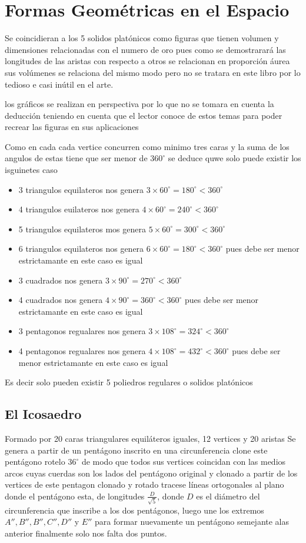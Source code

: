 \documentclass[a4paper]{book}
\begin{document}
\chapter{Formas Geométricas en el Espacio}
Se coincidieran a los 5 solidos platónicos como figuras que tienen volumen y dimensiones relacionadas con el numero de oro pues como se demostrarará  las longitudes de las aristas con respecto a otros se relacionan en proporción áurea sus volúmenes se relaciona del mismo modo pero no se tratara en este libro por lo tedioso e casi inútil en el arte.

los gráficos se realizan en perspectiva por lo que no se tomara en cuenta la deducción teniendo en cuenta que el lector conoce de estos temas  para poder recrear las figuras en sus aplicaciones


Como en cada cada vertice concurren como minimo tres caras y la suma de los angulos de estas tiene que ser menor de $360^\circ$ se deduce quwe solo puede existir los isguinetes caso

\begin{itemize}
  \item 3 triangulos equilateros nos genera $3\times 60^\circ=180^\circ < 360^\circ$
  \item 4 triangulos euilateros nos genera $4\times 60^\circ=240^\circ < 360^\circ$
  \item 5 triangulos equilateros mos genera $5\times 60^\circ=300^\circ < 360^\circ$
  \item 6 triangulos equilateros nos genera $6\times 60^\circ=180^\circ < 360^\circ$ pues debe ser menor estrictamante en este caso es igual
  \item 3 cuadrados nos genera $3\times 90^\circ=270^\circ < 360^\circ$
  \item 4 cuadrados nos genera $4\times 90^\circ=360^\circ < 360^\circ$ pues debe ser menor estrictamante en este caso es igual
  \item 3 pentagonos regualares nos genera $3\times 108^\circ=324^\circ < 360^\circ$
  \item 4 pentagonos regualares nos genera $4\times 108^\circ=432^\circ < 360^\circ$ pues debe ser menor estrictamante en este caso es igual
\end{itemize}

 Es decir solo pueden existir  5 poliedros regulares o solidos platónicos

\section{El Icosaedro}
Formado por 20 caras triangulares equiláteros iguales, 12 vertices y 20 aristas
Se genera a partir de un pentágono inscrito en una circunferencia  clone este pentágono rotelo $36^\circ$ de modo que todos sus vertices coincidan con las medios arcos cuyas cuerdas son los lados del pentágono original y clonado  a partir de los vertices de este pentagon clonado y rotado  tracese líneas ortogonales al plano donde el pentágono esta, de longitudes $\frac{D}{\sqrt{5}}$, donde $D$ es el diámetro del circunferencia que inscribe a los dos pentágonos, luego une los extremos $A'',B'',B'',C'',D''$ y $E''$ para formar nuevamente un pentágono semejante alas anterior finalmente solo nos falta dos puntos.
\end{document}
